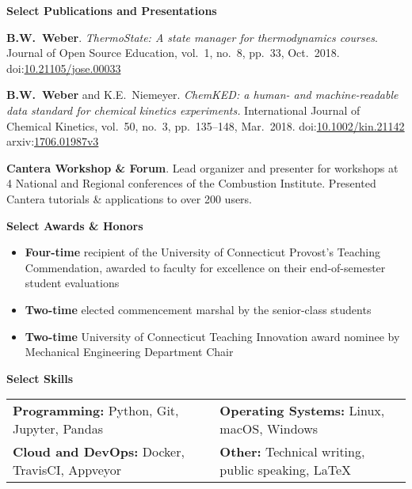 \documentclass[11pt]{article}
\newcommand{\cvsection}[1]
{
\begin{center}
    \large\textcolor{sectcol}{\textbf{#1}}
\end{center}
}
\newcommand*{\meauthor}[1]{\textbf{#1}}
\newcommand*{\papertitle}[1]{\textit{#1}}
\newcommand{\iconspace}{\enspace}
\newcommand{\arxiv}[1]{\aiarXiv\iconspace arxiv:\href{https://arxiv.org/abs/#1}{#1}}
\newcommand{\doi}[1]{\aiDoi\iconspace doi:\href{https://doi.org/#1}{#1}}
\begin{document}
\vspace{-10pt}

\cvsection{Select Publications and Presentations}

\meauthor{B.W.\ Weber}. \papertitle{ThermoState: A state manager for thermodynamics
courses}. Journal of Open Source Education, vol.\ 1, no.\ 8, pp.\ 33,
Oct.\ 2018.
\doi{10.21105/jose.00033}

\meauthor{B.W.\ Weber} and K.E.\ Niemeyer. \papertitle{ChemKED: a human- and
machine-readable data standard for chemical kinetics experiments.} International Journal
of Chemical Kinetics, vol.\ 50, no.\ 3, pp.\ 135--148, Mar.\ 2018.
\doi{10.1002/kin.21142} \quad \arxiv{1706.01987v3}

\textbf{Cantera Workshop \& Forum}. Lead organizer and presenter for workshops at 4
National and Regional conferences of the Combustion Institute. Presented Cantera tutorials
\& applications to over 200 users.


\cvsection{Select Awards \& Honors}

\begin{itemize}[leftmargin=*]
    \item \textbf{Four-time} recipient of the University of Connecticut Provost's Teaching
    Commendation, awarded to faculty for excellence on their end-of-semester student evaluations
    \item \textbf{Two-time} elected commencement marshal by the senior-class students
    \item \textbf{Two-time} University of Connecticut Teaching Innovation award nominee by
    Mechanical Engineering Department Chair
\end{itemize}

\vspace{-15pt}

\cvsection{Select Skills}

\begin{tabular}{ll}
\textbf{Programming:} Python, Git, Jupyter, Pandas & \textbf{Operating Systems:} Linux, macOS, Windows \\
\textbf{Cloud and DevOps:} Docker, TravisCI, Appveyor &
\textbf{Other:} Technical writing, public speaking, \LaTeX
\end{tabular}
\end{document}
